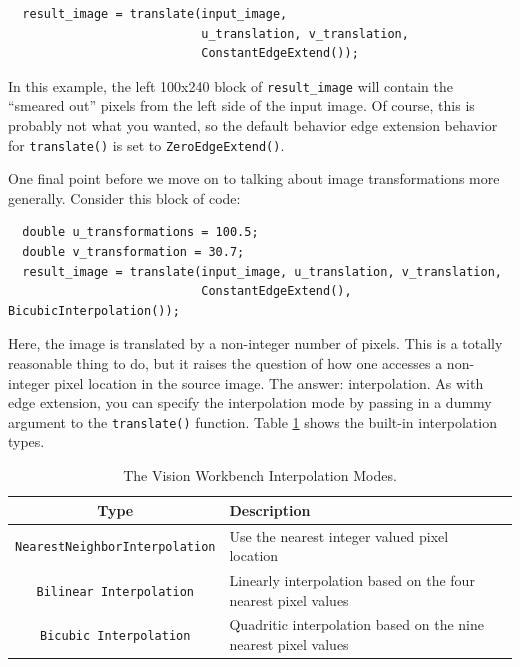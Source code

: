 \begin{verbatim} 
  result_image = translate(input_image, 
                           u_translation, v_translation, 
                           ConstantEdgeExtend());
\end{verbatim}

In this example, the left 100x240 block of \verb#result_image# will contain
the ``smeared out'' pixels from the left side of the input image.  Of
course, this is probably not what you wanted, so the default behavior
edge extension behavior for \verb#translate()# is set to
\verb#ZeroEdgeExtend()#.

One final point before we move on to talking about image
transformations more generally.  Consider this block of code:

\begin{verbatim} 
  double u_transformations = 100.5;
  double v_transformation = 30.7;
  result_image = translate(input_image, u_translation, v_translation, 
                           ConstantEdgeExtend(), BicubicInterpolation());
\end{verbatim}

Here, the image is translated by a non-integer number of pixels.  This
is a totally reasonable thing to do, but it raises the question of how
one accesses a non-integer pixel location in the source image.  The
answer: interpolation.  As with edge extension, you can
specify the interpolation mode by passing in a dummy argument to the
\verb#translate()# function.  Table \ref{tbl:interpolation-modes}
shows the built-in interpolation types.

\begin{table}[t]\begin{centering}
\begin{tabular}{|c|l|l|} \hline
Type & Description \\ \hline \hline
\verb#NearestNeighborInterpolation# & Use the nearest integer valued pixel location \\ \hline
\verb#Bilinear Interpolation# & Linearly interpolation based on the four nearest pixel values \\ \hline
\verb#Bicubic Interpolation# & Quadritic interpolation based on the nine nearest pixel values \\ \hline
\end{tabular}
\caption{The Vision Workbench Interpolation Modes.}
\label{tbl:interpolation-modes}
\end{centering}\end{table}

